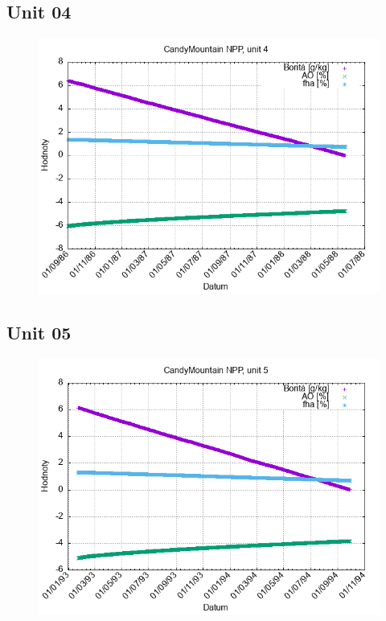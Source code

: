 \documentclass{article}
\begin{document}
\subsection*{Unit 04}
\begin{figure}[h!]
\centering
\includegraphics[width=14cm]{./grafy/CandyMountain04.png}
\end{figure}
\clearpage
\subsection*{Unit 05}
\begin{figure}[h!]
\centering
\includegraphics[width=14cm]{./grafy/CandyMountain05.png}
\end{figure}
\clearpage
\end{document}
